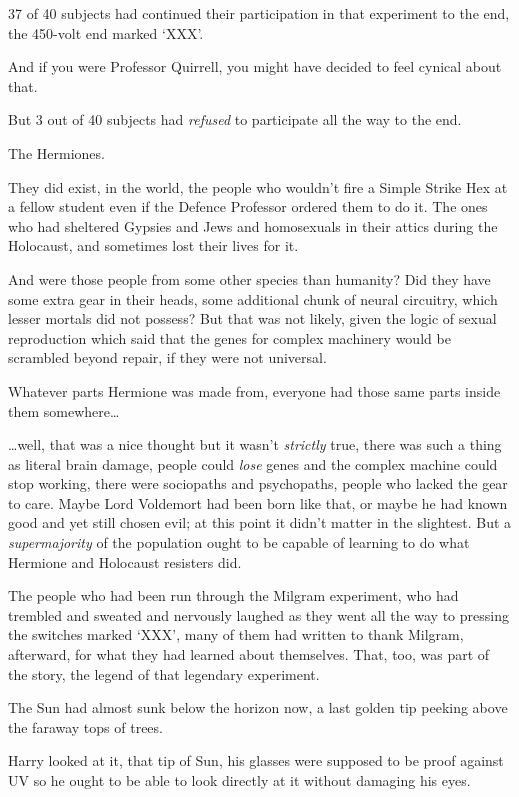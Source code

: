 37 of 40 subjects had continued their participation in that experiment
to the end, the 450-volt end marked `XXX'.

And if you were Professor Quirrell, you might have decided to feel
cynical about that.

But 3 out of 40 subjects had \emph{refused} to participate all the way
to the end.

The Hermiones.

They did exist, in the world, the people who wouldn't fire a Simple
Strike Hex at a fellow student even if the Defence Professor ordered
them to do it. The ones who had sheltered Gypsies and Jews and
homosexuals in their attics during the Holocaust, and sometimes lost
their lives for it.

And were those people from some other species than humanity? Did they
have some extra gear in their heads, some additional chunk of neural
circuitry, which lesser mortals did not possess? But that was not
likely, given the logic of sexual reproduction which said that the genes
for complex machinery would be scrambled beyond repair, if they were not
universal.

Whatever parts Hermione was made from, everyone had those same parts
inside them somewhere\ldots{}

\ldots{}well, that was a nice thought but it wasn't \emph{strictly}
true, there was such a thing as literal brain damage, people could
\emph{lose} genes and the complex machine could stop working, there were
sociopaths and psychopaths, people who lacked the gear to care. Maybe
Lord Voldemort had been born like that, or maybe he had known good and
yet still chosen evil; at this point it didn't matter in the slightest.
But a \emph{supermajority} of the population ought to be capable of
learning to do what Hermione and Holocaust resisters did.

The people who had been run through the Milgram experiment, who had
trembled and sweated and nervously laughed as they went all the way to
pressing the switches marked `XXX', many of them had written to thank
Milgram, afterward, for what they had learned about themselves. That,
too, was part of the story, the legend of that legendary experiment.

The Sun had almost sunk below the horizon now, a last golden tip peeking
above the faraway tops of trees.

Harry looked at it, that tip of Sun, his glasses were supposed to be
proof against UV so he ought to be able to look directly at it without
damaging his eyes.

